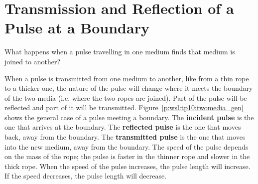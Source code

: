
\section{Transmission and Reflection of a Pulse at a Boundary}

What happens when a pulse travelling in one medium finds that medium is joined to another?


When a pulse is transmitted from one medium to another, like from a thin rope to a thicker one, the nature of the pulse will change where it meets the boundary of the two media (i.e. where the two ropes are joined). Part of the pulse will be reflected and part of it will be transmitted. Figure~\ref{p:wsl:tp10:twomedia_gen} shows the general case of a pulse meeting a boundary. The \textbf{incident pulse} is the one that arrives at the boundary. The \textbf{reflected pulse} is the one that moves back, away from the boundary. The \textbf{transmitted pulse} is the one that moves into the new medium, away from the boundary. The speed of the pulse depends on the mass of the rope; the pulse is faster in the thinner rope and slower in the thick rope. When the speed of the pulse increases, the pulse length will increase. If the speed decreases, the pulse length will decrease.


